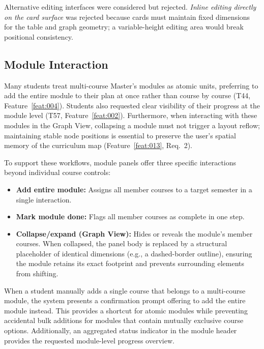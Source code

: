 Alternative editing interfaces were considered but rejected. \emph{Inline editing directly on the card surface} was rejected because cards must maintain fixed dimensions for the table and graph geometry; a variable-height editing area would break positional consistency.

\subsection{Module Interaction}
\label{sec:module-interaction}

Many students treat multi-course Master's modules as atomic units, preferring to add the entire module to their plan at once rather than course by course (T44, Feature~\ref{feat:004}). Students also requested clear visibility of their progress at the module level (T57, Feature~\ref{feat:002}). Furthermore, when interacting with these modules in the Graph View, collapsing a module must not trigger a layout reflow; maintaining stable node positions is essential to preserve the user's spatial memory of the curriculum map (Feature~\ref{feat:013}, Req.~2).

To support these workflows, module panels offer three specific interactions beyond individual course controls:
\begin{itemize}
  \item \textbf{Add entire module:} Assigns all member courses to a target semester in a single interaction.
  \item \textbf{Mark module done:} Flags all member courses as complete in one step.
  \item \textbf{Collapse/expand (Graph View):} Hides or reveals the module's member courses. When collapsed, the panel body is replaced by a structural placeholder of identical dimensions (e.g., a dashed-border outline), ensuring the module retains its exact footprint and prevents surrounding elements from shifting.
\end{itemize}

When a student manually adds a single course that belongs to a multi-course module, the system presents a confirmation prompt offering to add the entire module instead. This provides a shortcut for atomic modules while preventing accidental bulk additions for modules that contain mutually exclusive course options. Additionally, an aggregated status indicator in the module header provides the requested module-level progress overview.

